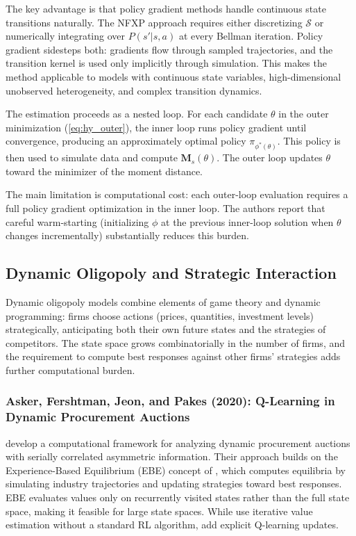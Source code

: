 The key advantage is that policy gradient methods handle continuous state transitions naturally. The NFXP approach requires either discretizing $\mathcal{S}$ or numerically integrating over $P(s'|s,a)$ at every Bellman iteration. Policy gradient sidesteps both: gradients flow through sampled trajectories, and the transition kernel is used only implicitly through simulation. This makes the method applicable to models with continuous state variables, high-dimensional unobserved heterogeneity, and complex transition dynamics.

The estimation proceeds as a nested loop. For each candidate $\theta$ in the outer minimization (\ref{eq:hy_outer}), the inner loop runs policy gradient until convergence, producing an approximately optimal policy $\pi_{\phi^*(\theta)}$. This policy is then used to simulate data and compute $\mathbf{M}_s(\theta)$. The outer loop updates $\theta$ toward the minimizer of the moment distance.

The main limitation is computational cost: each outer-loop evaluation requires a full policy gradient optimization in the inner loop. The authors report that careful warm-starting (initializing $\phi$ at the previous inner-loop solution when $\theta$ changes incrementally) substantially reduces this burden.


\subsection{Dynamic Oligopoly and Strategic Interaction}

Dynamic oligopoly models combine elements of game theory and dynamic programming: firms choose actions (prices, quantities, investment levels) strategically, anticipating both their own future states and the strategies of competitors. The state space grows combinatorially in the number of firms, and the requirement to compute best responses against other firms' strategies adds further computational burden.


\subsubsection{Asker, Fershtman, Jeon, and Pakes (2020): Q-Learning in Dynamic Procurement Auctions}

\citet{AskerEtAl2020} develop a computational framework for analyzing dynamic procurement auctions with serially correlated asymmetric information. Their approach builds on the Experience-Based Equilibrium (EBE) concept of \citet{FershtmanPakes2012}, which computes equilibria by simulating industry trajectories and updating strategies toward best responses. EBE evaluates values only on recurrently visited states rather than the full state space, making it feasible for large state spaces. While \citet{FershtmanPakes2012} use iterative value estimation without a standard RL algorithm, \citet{AskerEtAl2020} add explicit Q-learning updates.

